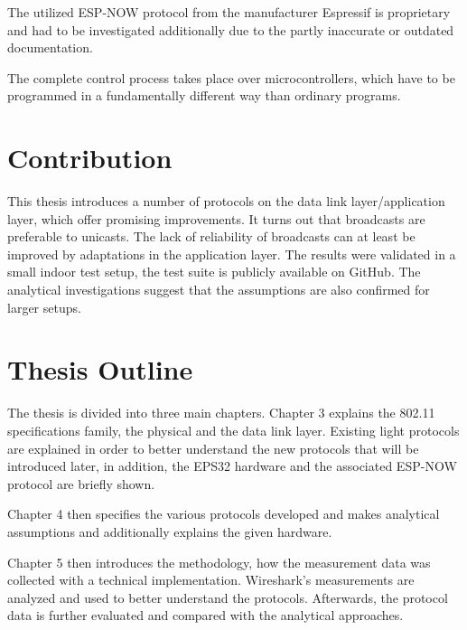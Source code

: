 The utilized ESP-NOW protocol from the manufacturer Espressif is proprietary
and had to be investigated additionally due to the partly inaccurate or outdated documentation.

The complete control process takes place over microcontrollers, 
which have to be programmed in a fundamentally different way than ordinary programs.

\section*{Contribution}

This thesis introduces a number of protocols on the data link layer/application layer,
which offer promising improvements.
It turns out that broadcasts are preferable to unicasts.
The lack of reliability of broadcasts can at least be improved by adaptations in the application layer.
The results were validated in a small indoor test setup,
the test suite is publicly available on GitHub.
The analytical investigations suggest that the assumptions are also confirmed for larger setups.

\section*{Thesis Outline}

The thesis is divided into three main chapters.
Chapter 3 explains the 802.11 specifications family, the physical and the data link layer.
Existing light protocols are explained in order to better understand the new protocols that will be introduced later,
in addition, the EPS32 hardware and the associated ESP-NOW protocol are briefly shown.

Chapter 4 then specifies the various protocols developed and makes analytical assumptions and
additionally explains the given hardware.

Chapter 5 then introduces the methodology, how the measurement data was collected with a technical implementation.
Wireshark's measurements are analyzed and used to better understand the protocols.
Afterwards, the protocol data is further evaluated and compared with the analytical approaches.